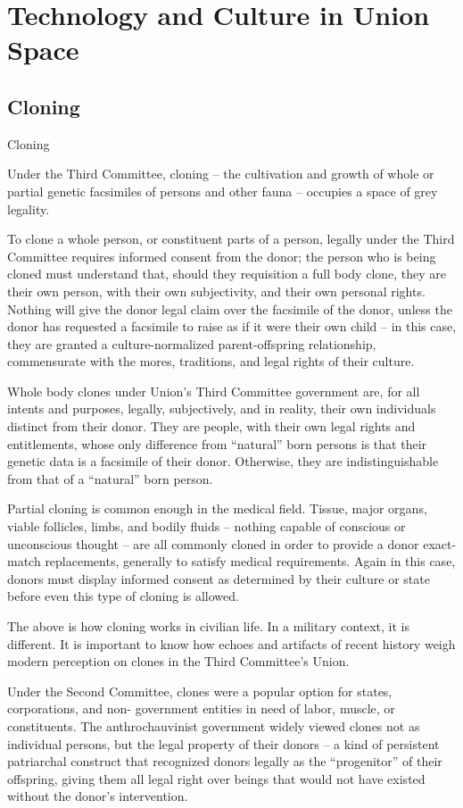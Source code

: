 \newpage
\section{Technology and Culture in Union Space}

\subsection{Cloning}
Cloning

Under the Third Committee, cloning -- the cultivation and growth of whole or partial genetic
facsimiles of persons and other fauna -- occupies a space of grey legality.


To clone a whole person, or constituent parts of a person, legally under the Third Committee
requires informed consent from the donor; the person who is being cloned must understand that,
should they requisition a full body clone, they are their own person, with their own subjectivity,
and their own personal rights. Nothing will give the donor legal claim over the facsimile of the
donor, unless the donor has requested a facsimile to raise as if it were their own child -- in this
case, they are granted a culture-normalized parent-offspring relationship, commensurate with the
mores, traditions, and legal rights of their culture.


Whole body clones under Union’s Third Committee government are, for all intents and purposes,
legally, subjectively, and in reality, their own individuals distinct from their donor. They are people,
with their own legal rights and entitlements, whose only difference from “natural” born persons is
that their genetic data is a facsimile of their donor. Otherwise, they are indistinguishable from that
of a “natural” born person.


Partial cloning is common enough in the medical field. Tissue, major organs, viable follicles,
limbs, and bodily fluids -- nothing capable of conscious or unconscious thought -- are all
commonly cloned in order to provide a donor exact-match replacements, generally to satisfy
medical requirements. Again in this case, donors must display informed consent as determined
by their culture or state before even this type of cloning is allowed.


The above is how cloning works in civilian life. In a military context, it is different. It is important
to know how echoes and artifacts of recent history weigh modern perception on clones in the
Third Committee’s Union.


Under the Second Committee, clones were a popular option for states, corporations, and non-
government entities in need of labor, muscle, or constituents. The anthrochauvinist government
widely viewed clones not as individual persons, but the legal property of their donors -- a kind of
persistent patriarchal construct that recognized donors legally as the “progenitor” of their
offspring, giving them all legal right over beings that would not have existed without the donor’s
intervention.


